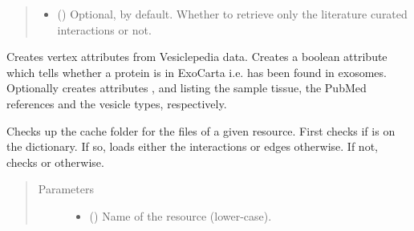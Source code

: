 \documentclass[letterpaper,10pt,english]{sphinxmanual}
\begin{document}
\begin{fulllineitems}
\begin{fulllineitems}
\begin{quote}
\begin{description}
\begin{itemize}
\item {} 
 () \textendash{} Optional,  by default. Whether to retrieve only the
literature curated interactions or not.

\end{itemize}

\end{description}\end{quote}

\end{fulllineitems}


\begin{fulllineitems}
\label{\detokenize{reference:pypath.main.PyPath.load_vesiclepedia_attrs}}
Creates vertex attributes from Vesiclepedia data. Creates a boolean
attribute  which tells whether a protein is
in ExoCarta i.e. has been found in exosomes. Optionally creates
attributes ,  and
 listing the sample tissue, the PubMed
references and the vesicle types, respectively.

\end{fulllineitems}


\begin{fulllineitems}
\label{\detokenize{reference:pypath.main.PyPath.lookup_cache}}
Checks up the cache folder for the files of a given resource.
First checks if  is on the  dictionary.
If so, loads either the interactions or edges otherwise. If
not, checks  or  otherwise.
\begin{quote}\begin{description}
\item[{Parameters}] \leavevmode\begin{itemize}
\item {} 
 () \textendash{} Name of the resource (lower-case).


\end{itemize}
\end{description}
\end{quote}
\end{fulllineitems}
\end{fulllineitems}
\end{document}
